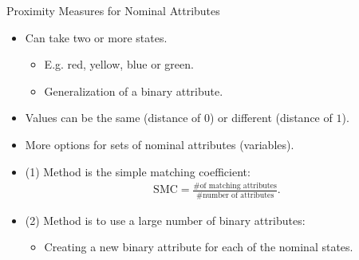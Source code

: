 \begin{frame}{Proximity Measures for Nominal Attributes}
	\begin{itemize}
		\item Can take two or more states.
		      \begin{itemize}
			      \item E.g. red, yellow, blue or green.
			      \item Generalization of a binary attribute.
		      \end{itemize}
		\item Values can be the same (distance of $0$) or different (distance of $1$).
		\item More options for sets of nominal attributes (variables).
		\item (1) Method is the simple matching coefficient:
		      \begin{align}
			      \text{SMC} = \frac{\# \text{of matching attributes}}{\# \text{number of attributes}}.
		      \end{align}
		\item (2) Method is to use a large number of binary attributes:
		      \begin{itemize}
			      \item Creating a new binary attribute for each of the nominal states.
		      \end{itemize}
	\end{itemize}
\end{frame}

